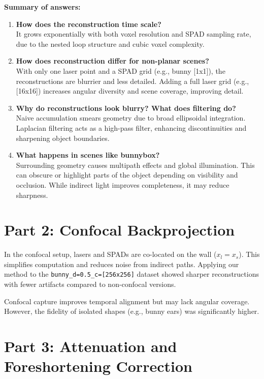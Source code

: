 \documentclass[a4paper,10pt]{article}
\begin{document}
\vspace{1em}
\textbf{Summary of answers:}

\begin{enumerate}
    \item \textbf{How does the reconstruction time scale?} \\
    It grows exponentially with both voxel resolution and SPAD sampling rate, due to the nested loop structure and cubic voxel complexity.

    \item \textbf{How does reconstruction differ for non-planar scenes?} \\
    With only one laser point and a SPAD grid (e.g., bunny [1x1]), the reconstructions are blurrier and less detailed. Adding a full laser grid (e.g., [16x16]) increases angular diversity and scene coverage, improving detail.

    \item \textbf{Why do reconstructions look blurry? What does filtering do?} \\
    Naive accumulation smears geometry due to broad ellipsoidal integration. Laplacian filtering acts as a high-pass filter, enhancing discontinuities and sharpening object boundaries.

    \item \textbf{What happens in scenes like bunnybox?} \\
    Surrounding geometry causes multipath effects and global illumination. This can obscure or highlight parts of the object depending on visibility and occlusion. While indirect light improves completeness, it may reduce sharpness.
\end{enumerate}

\section{Part 2: Confocal Backprojection}

In the confocal setup, lasers and SPADs are co-located on the wall ($x_l = x_s$). This simplifies computation and reduces noise from indirect paths. Applying our method to the \texttt{bunny\_d=0.5\_c=[256x256]} dataset showed sharper reconstructions with fewer artifacts compared to non-confocal versions.

Confocal capture improves temporal alignment but may lack angular coverage. However, the fidelity of isolated shapes (e.g., bunny ears) was significantly higher.

\section{Part 3: Attenuation and Foreshortening Correction}
\end{document}
